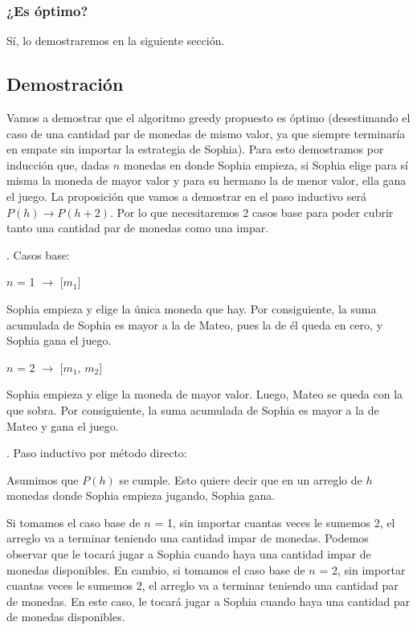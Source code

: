 \subsubsection{¿Es óptimo?}
Sí, lo demostraremos en la siguiente sección.

\subsection{Demostración}
Vamos a demostrar que el algoritmo greedy propuesto es óptimo (desestimando el caso de una cantidad par de monedas de mismo valor, ya que siempre terminaría en empate sin importar la estrategia de Sophia).
Para esto demostramos por inducción que, dadas $n$ monedas en donde Sophia empieza, si Sophia elige para sí misma la moneda de mayor valor y para su hermano la de menor valor, ella gana el juego.
La proposición que vamos a demostrar en el paso inductivo será $P(h) \longrightarrow  P(h+2)$. Por lo que necesitaremos 2 casos base para poder cubrir tanto una cantidad par de monedas como una impar.

\noindent{}. Casos base:

\begin{center}
$n$ = 1 $\longrightarrow$ [$m_1$]
\end{center}

Sophia empieza y elige la única moneda que hay. Por consiguiente, la suma acumulada de Sophia es mayor a la de Mateo, pues la de él queda en cero, y Sophia gana el juego.

\begin{center}
    $n$ = 2 $\longrightarrow$ [$m_1$, $m_2$]
\end{center}

Sophia empieza y elige la moneda de mayor valor. Luego, Mateo se queda con la que sobra. Por consiguiente, la suma acumulada de Sophia es mayor a la de Mateo y gana el juego.

\noindent{}. Paso inductivo por método directo:

Asumimos que $P(h)$ se cumple. Esto quiere decir que en un arreglo de $h$ monedas donde Sophia empieza jugando, Sophia gana.

Si tomamos el caso base de $n$ = 1, sin importar cuantas veces le sumemos 2, el arreglo va a terminar teniendo una cantidad impar de monedas. Podemos observar que
le tocará jugar a Sophia cuando haya una cantidad impar de monedas disponibles.
En cambio, si tomamos el caso base de $n$ = 2, sin importar cuantas veces le sumemos 2, el arreglo va a terminar teniendo una cantidad par de monedas. En este caso,
le tocará jugar a Sophia cuando haya una cantidad par de monedas disponibles.

